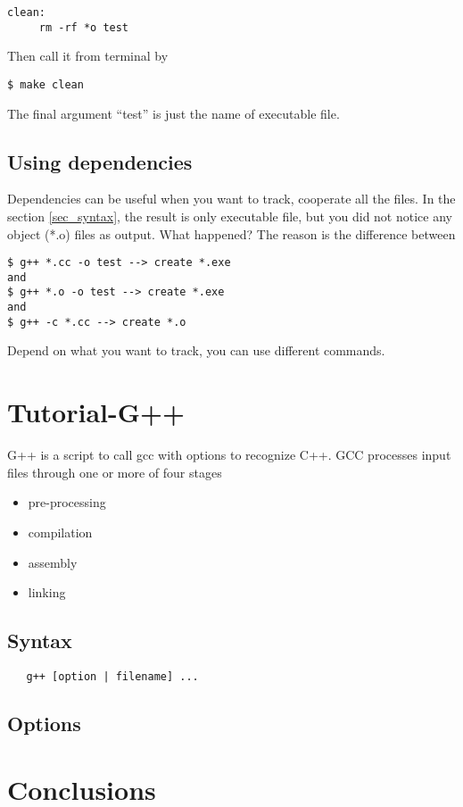 \documentclass[10pt,a4paper,draft,onecolumn]{article}
\begin{document}
\begin{verbatim}
clean:
     rm -rf *o test
\end{verbatim}

Then call it from terminal by

\begin{verbatim}
$ make clean
\end{verbatim}

The final argument ``test'' is just the name of executable file.

\subsection{Using dependencies}

Dependencies can be useful when you want to track, cooperate all the files. In the section \ref{sec_syntax}, the result is only executable file, but you did not notice any object (*.o) files as output. What happened? The reason is the difference between

\begin{verbatim}
$ g++ *.cc -o test --> create *.exe
and
$ g++ *.o -o test --> create *.exe
and
$ g++ -c *.cc --> create *.o
\end{verbatim}

Depend on what you want to track, you can use different commands.

\section{Tutorial-G++}

G++ is a script to call gcc with options to recognize C++. GCC processes input files through one or more of four stages

\begin{itemize}
\item pre-processing
\item compilation
\item assembly
\item linking
\end{itemize}

\subsection{Syntax}
\begin{verbatim}
   g++ [option | filename] ...
\end{verbatim}

\subsection{Options}



\section{Conclusions}
\end{document}
